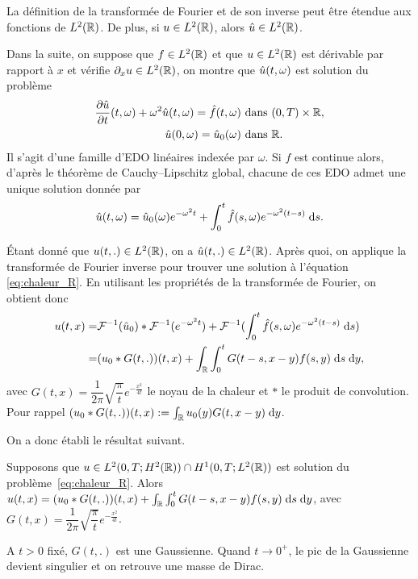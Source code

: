 \documentclass[12pt,a4paper,twoside]{article}
\begin{document}
La d\'efinition de la transform\'ee de Fourier et de son inverse peut \^etre \'etendue
aux fonctions de $L^2(\mathbb{R})$. De plus, si $u \in L^2(\mathbb{R})$, alors $\hat u \in L^2(\mathbb{R})$.

Dans la suite, on suppose que $f \in L^2(\mathbb{R})$
et que $u \in L^2(\mathbb{R})$ est d\'erivable par rapport \`a $x$ et v\'erifie
$\partial_x u \in L^2(\mathbb{R})$,
on montre que $\hat u(t,\omega)$ est solution du probl\`eme
\begin{align*}
  \dfrac{\partial \hat u}{\partial t}(t,\omega) + \omega^2 \hat u(t , \omega) = \hat f(t,\omega) 
  & \text{ dans } (0,T) \times \mathbb{R} ,
  \\
  \hat u(0 , \omega) = \hat u_0(\omega)
  & \text{ dans } \mathbb{R} .
\end{align*}
Il s'agit d'une famille d'EDO lin\'eaires index\'ee par $\omega$.
Si $f$ est continue alors, d'apr\`es le th\'eor\`eme de Cauchy--Lipschitz global,
chacune de ces EDO admet une unique solution donn\'ee par
\begin{align*}
  \hat u(t,\omega) = \hat u_0(\omega) e^{- \omega^2 t} 
  + \int_0^t \hat f(s,\omega) e^{- \omega^2 (t - s)} \;\mathrm{d} s . 
\end{align*}

\'Etant donn\'e que $u(t,.) \in L^2(\mathbb{R})$, on a $\hat u(t,.) \in L^2(\mathbb{R})$.
Apr\`es quoi, on applique la transform\'ee de Fourier inverse pour trouver
une solution \`a l'\'equation \eqref{eq:chaleur_R}.
En utilisant les propri\'et\'es de la transform\'ee de Fourier, on obtient donc
\begin{align*}
  u(t,x) 
  =& \mathcal{F}^{-1}(\hat u_0) * \mathcal{F}^{-1} (e^{-\omega^2 t})
  + \mathcal{F}^{-1} (\int_0^t \hat f(s,\omega) e^{- \omega^2(t-s)} \;\mathrm{d} s)
  \\
  =& (u_0 * G(t,.))(t,x) + \int_{\mathbb{R}} \int_0^t G(t-s, x-y) f(s,y) \;\mathrm{d} s \;\mathrm{d} y ,
\end{align*}
avec $G(t,x) = \dfrac{1}{2 \pi} \sqrt{\dfrac{\pi}{t}} e^{- \frac{x^2}{4t}}$
le noyau de la chaleur et $*$ le produit de convolution.
Pour rappel
$(u_0 * G(t,.))(t,x) := \int_{\mathbb{R}} u_0(y) G(t,x-y) \;\mathrm{d} y$.


On a donc \'etabli le r\'esultat suivant.
\begin{theorem}
  Supposons que $u \in L^2(0,T;H^2(\mathbb{R})) \cap H^1(0,T;L^2(\mathbb{R}))$ est solution
  du probl\`eme~\eqref{eq:chaleur_R}.
  Alors $u(t,x) = (u_0 * G(t,.))(t,x) + \int_{\mathbb{R}} \int_0^t G(t-s, x-y) f(s,y) \;\mathrm{d} s \;\mathrm{d} y$,
  avec $G(t,x) = \dfrac{1}{2 \pi} \sqrt{\dfrac{\pi}{t}} e^{- \frac{x^2}{4t}}$.
\end{theorem}


\begin{remark}
  A $t>0$ fix\'e, $G(t,.)$ est une Gaussienne.
  Quand $t \to 0^+$, le pic de la Gaussienne devient singulier et on retrouve une masse de Dirac.
\end{remark}
\end{document}
